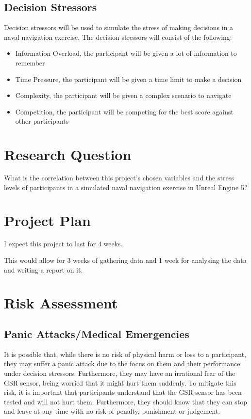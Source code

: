 \documentclass{article}
\begin{document}
\subsection{Decision Stressors}

Decision stressors will be used to simulate the stress of making decisions in a naval navigation exercise. The decision stressors will consist of the following:

\begin{itemize}
    \item Information Overload, the participant will be given a lot of information to remember
    \item Time Pressure, the participant will be given a time limit to make a decision
    \item Complexity, the participant will be given a complex scenario to navigate
    \item Competition, the participant will be competing for the best score against other participants
\end{itemize}






\section{Research Question}

What is the correlation between this project's chosen variables and the stress levels of participants in a simulated naval navigation exercise in Unreal Engine 5?

\section{Project Plan}

I expect this project to last for 4 weeks.

This would allow for 3 weeks of gathering data and 1 week for analysing the data and writing a report on it.

\section{Risk Assessment}

\subsection{Panic Attacks/Medical Emergencies}

It is possible that, while there is no risk of physical harm or loss to a participant, they may suffer a panic attack due to the focus on them and their performance under decision stressors. Furthermore, they may have an irrational fear of the GSR sensor, being worried that it might hurt them suddenly. To mitigate this risk, it is important that participants understand that the GSR sensor has been tested and will not hurt them. Furthermore, they should know that they can stop and leave at any time with no risk of penalty, punishment or judgement.
\end{document}
